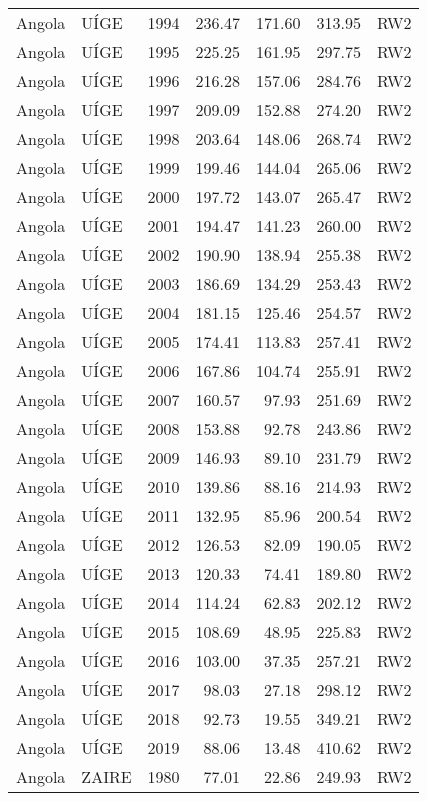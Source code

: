 \begin{longtable}{lllrrrl}
  Angola & UÍGE & 1994 & 236.47 & 171.60 & 313.95 & RW2 \\ 
  Angola & UÍGE & 1995 & 225.25 & 161.95 & 297.75 & RW2 \\ 
  Angola & UÍGE & 1996 & 216.28 & 157.06 & 284.76 & RW2 \\ 
  Angola & UÍGE & 1997 & 209.09 & 152.88 & 274.20 & RW2 \\ 
  Angola & UÍGE & 1998 & 203.64 & 148.06 & 268.74 & RW2 \\ 
  Angola & UÍGE & 1999 & 199.46 & 144.04 & 265.06 & RW2 \\ 
  Angola & UÍGE & 2000 & 197.72 & 143.07 & 265.47 & RW2 \\ 
  Angola & UÍGE & 2001 & 194.47 & 141.23 & 260.00 & RW2 \\ 
  Angola & UÍGE & 2002 & 190.90 & 138.94 & 255.38 & RW2 \\ 
  Angola & UÍGE & 2003 & 186.69 & 134.29 & 253.43 & RW2 \\ 
  Angola & UÍGE & 2004 & 181.15 & 125.46 & 254.57 & RW2 \\ 
  Angola & UÍGE & 2005 & 174.41 & 113.83 & 257.41 & RW2 \\ 
  Angola & UÍGE & 2006 & 167.86 & 104.74 & 255.91 & RW2 \\ 
  Angola & UÍGE & 2007 & 160.57 & 97.93 & 251.69 & RW2 \\ 
  Angola & UÍGE & 2008 & 153.88 & 92.78 & 243.86 & RW2 \\ 
  Angola & UÍGE & 2009 & 146.93 & 89.10 & 231.79 & RW2 \\ 
  Angola & UÍGE & 2010 & 139.86 & 88.16 & 214.93 & RW2 \\ 
  Angola & UÍGE & 2011 & 132.95 & 85.96 & 200.54 & RW2 \\ 
  Angola & UÍGE & 2012 & 126.53 & 82.09 & 190.05 & RW2 \\ 
  Angola & UÍGE & 2013 & 120.33 & 74.41 & 189.80 & RW2 \\ 
  Angola & UÍGE & 2014 & 114.24 & 62.83 & 202.12 & RW2 \\ 
  Angola & UÍGE & 2015 & 108.69 & 48.95 & 225.83 & RW2 \\ 
  Angola & UÍGE & 2016 & 103.00 & 37.35 & 257.21 & RW2 \\ 
  Angola & UÍGE & 2017 & 98.03 & 27.18 & 298.12 & RW2 \\ 
  Angola & UÍGE & 2018 & 92.73 & 19.55 & 349.21 & RW2 \\ 
  Angola & UÍGE & 2019 & 88.06 & 13.48 & 410.62 & RW2 \\ 
  Angola & ZAIRE & 1980 & 77.01 & 22.86 & 249.93 & RW2 \\ 

\end{longtable}
